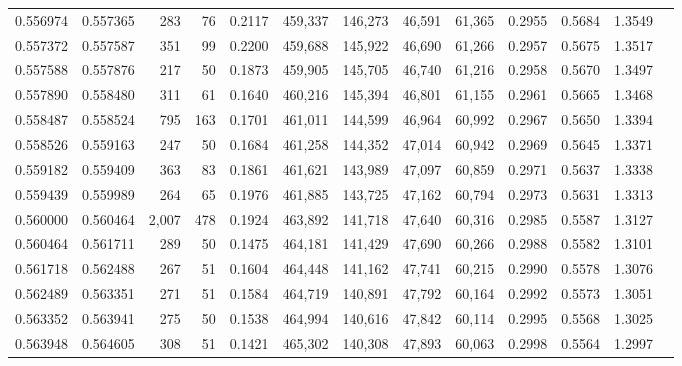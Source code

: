 \begin{tabular}{rrrrrrrrrrrrr}
0.556974 & 0.557365 &   283 &  76 &                                     0.2117 & 459,337 & 146,273 &  46,591 &  61,365 & 0.2955 & 0.5684 & 1.3549 \\
0.557372 & 0.557587 &   351 &  99 &                                     0.2200 & 459,688 & 145,922 &  46,690 &  61,266 & 0.2957 & 0.5675 & 1.3517 \\
0.557588 & 0.557876 &   217 &  50 &                                     0.1873 & 459,905 & 145,705 &  46,740 &  61,216 & 0.2958 & 0.5670 & 1.3497 \\
0.557890 & 0.558480 &   311 &  61 &                                     0.1640 & 460,216 & 145,394 &  46,801 &  61,155 & 0.2961 & 0.5665 & 1.3468 \\
0.558487 & 0.558524 &   795 & 163 &                                     0.1701 & 461,011 & 144,599 &  46,964 &  60,992 & 0.2967 & 0.5650 & 1.3394 \\
0.558526 & 0.559163 &   247 &  50 &                                     0.1684 & 461,258 & 144,352 &  47,014 &  60,942 & 0.2969 & 0.5645 & 1.3371 \\
0.559182 & 0.559409 &   363 &  83 &                                     0.1861 & 461,621 & 143,989 &  47,097 &  60,859 & 0.2971 & 0.5637 & 1.3338 \\
0.559439 & 0.559989 &   264 &  65 &                                     0.1976 & 461,885 & 143,725 &  47,162 &  60,794 & 0.2973 & 0.5631 & 1.3313 \\
0.560000 & 0.560464 & 2,007 & 478 &                                     0.1924 & 463,892 & 141,718 &  47,640 &  60,316 & 0.2985 & 0.5587 & 1.3127 \\
0.560464 & 0.561711 &   289 &  50 &                                     0.1475 & 464,181 & 141,429 &  47,690 &  60,266 & 0.2988 & 0.5582 & 1.3101 \\
0.561718 & 0.562488 &   267 &  51 &                                     0.1604 & 464,448 & 141,162 &  47,741 &  60,215 & 0.2990 & 0.5578 & 1.3076 \\
0.562489 & 0.563351 &   271 &  51 &                                     0.1584 & 464,719 & 140,891 &  47,792 &  60,164 & 0.2992 & 0.5573 & 1.3051 \\
0.563352 & 0.563941 &   275 &  50 &                                     0.1538 & 464,994 & 140,616 &  47,842 &  60,114 & 0.2995 & 0.5568 & 1.3025 \\
0.563948 & 0.564605 &   308 &  51 &                                     0.1421 & 465,302 & 140,308 &  47,893 &  60,063 & 0.2998 & 0.5564 & 1.2997 \\

\end{tabular}
